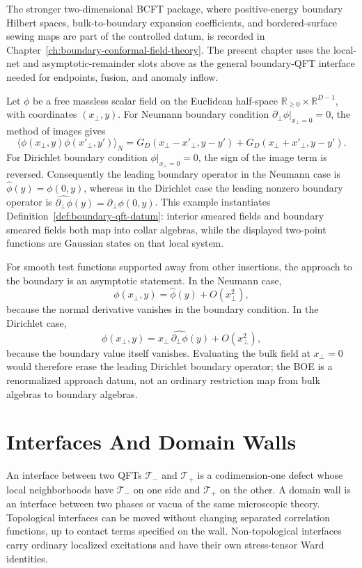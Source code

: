 The stronger two-dimensional BCFT package, where positive-energy boundary
Hilbert spaces, bulk-to-boundary expansion coefficients, and bordered-surface
sewing maps are part of the controlled datum, is recorded in
Chapter~\ref{ch:boundary-conformal-field-theory}.  The present chapter uses
the local-net and asymptotic-remainder slots above as the general boundary-QFT
interface needed for endpoints, fusion, and anomaly inflow.

\begin{example}
\label{ex:free-scalar-half-space-boe}
Let \(\phi\) be a free massless scalar field on the Euclidean half-space
\(\mathbb R_{\ge0}\times\mathbb R^{D-1}\), with coordinates
\((x_\perp,y)\).  For Neumann boundary condition
\(\partial_\perp\phi|_{x_\perp=0}=0\), the method of images gives
\[
  \langle\phi(x_\perp,y)\phi(x'_\perp,y')\rangle_N
  =
  G_D(x_\perp-x'_\perp,y-y')
  +
  G_D(x_\perp+x'_\perp,y-y').
\]
For Dirichlet boundary condition \(\phi|_{x_\perp=0}=0\), the sign of the
image term is reversed.  Consequently the leading boundary operator in the
Neumann case is \(\widehat\phi(y)=\phi(0,y)\), whereas in the Dirichlet case
the leading nonzero boundary operator is
\(\widehat{\partial_\perp\phi}(y)=\partial_\perp\phi(0,y)\).  This example
instantiates Definition~\ref{def:boundary-qft-datum}: interior smeared fields
and boundary smeared fields both map into collar algebras, while the displayed
two-point functions are Gaussian states on that local system.

For smooth test functions supported away from other insertions, the approach
to the boundary is an asymptotic statement.  In the Neumann case,
\[
  \phi(x_\perp,y)
  =
  \widehat\phi(y)+O(x_\perp^2),
\]
because the normal derivative vanishes in the boundary condition.  In the
Dirichlet case,
\[
  \phi(x_\perp,y)
  =
  x_\perp\,\widehat{\partial_\perp\phi}(y)+O(x_\perp^2),
\]
because the boundary value itself vanishes.  Evaluating the bulk field at
\(x_\perp=0\) would therefore erase the leading Dirichlet boundary operator;
the BOE is a renormalized approach datum, not an ordinary restriction map from
bulk algebras to boundary algebras.
\end{example}

\section{Interfaces And Domain Walls}

\begin{definition}
\label{def:interface-domain-wall}
An interface between two QFTs \(\mathcal T_-\) and \(\mathcal T_+\) is a
codimension-one defect whose local neighborhoods have \(\mathcal T_-\) on one
side and \(\mathcal T_+\) on the other.  A domain wall is an interface between
two phases or vacua of the same microscopic theory.  Topological interfaces
can be moved without changing separated correlation functions, up to contact
terms specified on the wall.  Non-topological interfaces carry ordinary
localized excitations and have their own stress-tensor Ward identities.
\end{definition}

